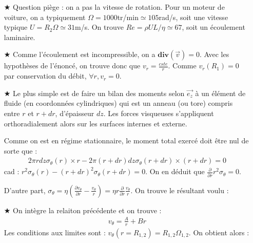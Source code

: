 \documentclass{report}
\begin{document}
\begin{itemize}
		
	\item[$\bigstar$] Question piège : on a pas la vitesse de rotation. Pour un moteur de voiture, on a typiquement $\Omega=1000$tr/min$\simeq105$rad/s, soit une vitesse typique $U=R_2\Omega\simeq31$m/s. On trouve $Re=\rho UL/\eta\simeq 67$, soit un écoulement laminaire.
	
	\item[$\bigstar$] Comme l'écoulement est incompressible, on a $\mathbf{div}(\vec{v})=0$. Avec les hypothèses de l'énoncé, on trouve donc que $v_r=\frac{cste}{r}$. Comme $v_r(R_1)=0$ par conservation du débit, $\forall r, v_r=0$.
	
	\item[$\bigstar$] Le plus simple est de faire un bilan des moments selon $\vec{e_z}$ à un élément de fluide (en coordonnées cylindriques) qui est un anneau (ou tore) compris entre $r$ et $r+dr$, d'épaisseur $dz$. Les forces visqueuses s'appliquent orthoradialement alors sur les surfaces internes et externe. 

Comme on est en régime stationnaire, le moment total exercé doit être nul de sorte que : 
\begin{align*}
	2\pi r dz \sigma_\theta(r)\times r - 2\pi (r+dr) dz \sigma_\theta(r+dr)\times (r+dr) = 0
\end{align*}
cad : $r^2 \sigma_\theta(r) - (r+dr)^2 \sigma_\theta(r+dr) = 0$. On en déduit que $\frac{\partial}{\partial r}r^2\sigma_\theta=0$.

D'autre part, $\sigma_\theta=\eta\left(\frac{\partial v_\theta}{\partial r}-\frac{v_\theta}{r}\right) =\eta r \frac{\partial}{\partial r}\frac{v_\theta}{r} $. On trouve le résultant voulu :

\noindent{}
	
	\item[$\bigstar$] On intègre la relaiton précédente et on trouve :
	\begin{align*}
		v_\theta = \frac{A}{r} + Br
	\end{align*}
	Les conditions aux limites sont : $v_\theta(r=R_{1,2})=R_{1,2}\Omega_{1,2}$. On obtient alors : 
	
	\noindent{}
	

\end{itemize}
\end{document}
